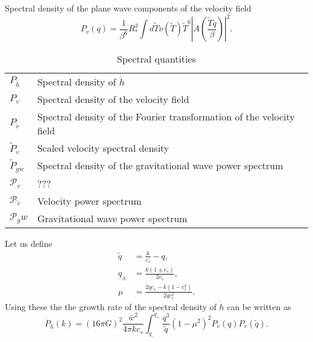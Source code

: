 Spectral density of the plane wave components of the velocity field \cite[eq. 4.17]{hindmarsh_gw_pt_2019}
\begin{equation}
P_v(q) = \frac{1}{\beta^6}{R_*^3} \int d\tilde{T} \nu(\tilde{T}) \tilde{T}^6 |A(\frac{\tilde{T}q}{\beta})|^2.
\end{equation}


\begin{table}
\caption{Spectral quantities}
\begin{tabular}{l|l}
$P_{\dot{h}}$ & Spectral density of $\dot{h}$ \\
$P_v$ & Spectral density of the velocity field \\
$P_{\tilde{v}}$ & Spectral density of the Fourier transformation of the velocity field \\
$\tilde{P}_v$ & Scaled velocity spectral density \\
$\tilde{P}_{gw}$ & Spectral density of the gravitational wave power spectrum \\
$\mathcal{P}_v$ & ??? \\
$\mathcal{P}_{\tilde{v}}$ & Velocity power spectrum \\
$\mathcal{P}_gw$ & Gravitational wave power spectrum
\end{tabular}
\label{table:symbols}
\end{table}

Let us define
\begin{align}
\tilde{q} &= \frac{k}{c_s} - q, \\
q_\pm &= \frac{k(1 \pm c_s)}{2 c_s}, \\
\mu &= \frac{2qc_s - k(1 - c_s^2)}{2qc_s^2}.
\end{align}
Using these the the growth rate of the spectral density of $\dot{h}$ can be written as
\begin{equation}
\dot{P}_{\dot{h}} (k) = (16 \pi G)^2 \frac{\bar{w}^2}{4 \pi k c_s} \int_{q_-}^{q_+} \frac{q^3}{\tilde{q}} (1 - \mu^2)^2 P_v(q) P_v(\tilde{q}).
\end{equation}

